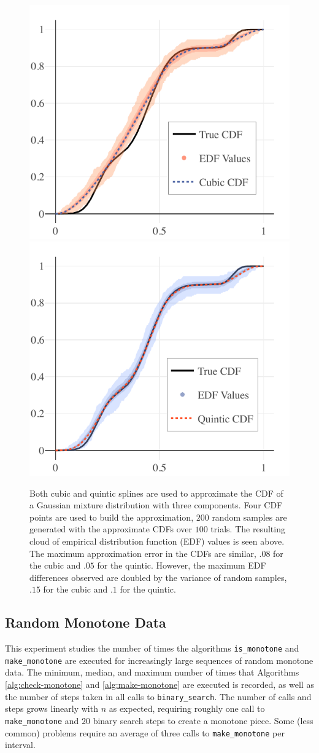 \documentclass{scspaperproc}
\theoremstyle{scsthe}
\begin{document}
\begin{figure}
  \centering
  \includegraphics[width=.4\textwidth]{experiment_2_cubic_dist}
  \includegraphics[width=.4\textwidth]{experiment_2_quintic_dist}
  \caption{Both cubic and quintic splines are used to approximate the CDF of a Gaussian mixture distribution with three components. Four CDF points are used to build the approximation, $200$ random samples are generated with the approximate CDFs over $100$ trials. The resulting cloud of empirical distribution function (EDF) values is seen above. The maximum approximation error in the CDFs are similar, $.08$ for the cubic and $.05$ for the quintic. However, the maximum EDF differences observed are doubled by the variance of random samples, $.15$ for the cubic and $.1$ for the quintic.}
  \label{fig:experiment_2_results}
\end{figure}



\subsection{Random Monotone Data}

This experiment studies the number of times the algorithms \texttt{is\_monotone} and \texttt{make\_monotone} are executed for increasingly large sequences of random monotone data. The minimum, median, and maximum number of times that Algorithms \ref{alg:check-monotone} and \ref{alg:make-monotone} are executed is recorded, as well as the number of steps taken in all calls to \texttt{binary\_search}. The number of calls and steps grows linearly with $n$ as expected, requiring roughly one call to \texttt{make\_monotone} and $20$ binary search steps to create a monotone piece. Some (less common) problems require an average of three calls to \texttt{make\_monotone} per interval.
\end{document}

